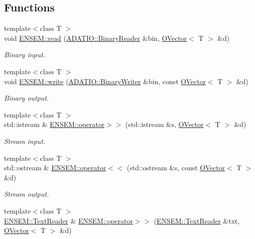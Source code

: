 \subsection*{Functions}
\begin{DoxyCompactItemize}
\item 
{\footnotesize template$<$class T $>$ }\\void \mbox{\hyperlink{group__obsvector_ga78b51667ce539bc967764a39c77afbe0}{E\+N\+S\+E\+M\+::read}} (\mbox{\hyperlink{classADATIO_1_1BinaryReader}{A\+D\+A\+T\+I\+O\+::\+Binary\+Reader}} \&bin, \mbox{\hyperlink{classENSEM_1_1OVector}{O\+Vector}}$<$ T $>$ \&d)
\begin{DoxyCompactList}\small\item\em Binary input. \end{DoxyCompactList}\item 
{\footnotesize template$<$class T $>$ }\\void \mbox{\hyperlink{group__obsvector_gab76c1efedcd0fb2cbe27c2c995c6d110}{E\+N\+S\+E\+M\+::write}} (\mbox{\hyperlink{classADATIO_1_1BinaryWriter}{A\+D\+A\+T\+I\+O\+::\+Binary\+Writer}} \&bin, const \mbox{\hyperlink{classENSEM_1_1OVector}{O\+Vector}}$<$ T $>$ \&d)
\begin{DoxyCompactList}\small\item\em Binary output. \end{DoxyCompactList}\item 
{\footnotesize template$<$class T $>$ }\\std\+::istream \& \mbox{\hyperlink{group__obsvector_ga1777cce8b68792ed5e825b20f286394e}{E\+N\+S\+E\+M\+::operator$>$$>$}} (std\+::istream \&s, \mbox{\hyperlink{classENSEM_1_1OVector}{O\+Vector}}$<$ T $>$ \&d)
\begin{DoxyCompactList}\small\item\em Stream input. \end{DoxyCompactList}\item 
{\footnotesize template$<$class T $>$ }\\std\+::ostream \& \mbox{\hyperlink{group__obsvector_ga9f3b52a0bbdae09acbfdfc9471404f5d}{E\+N\+S\+E\+M\+::operator$<$$<$}} (std\+::ostream \&s, const \mbox{\hyperlink{classENSEM_1_1OVector}{O\+Vector}}$<$ T $>$ \&d)
\begin{DoxyCompactList}\small\item\em Stream output. \end{DoxyCompactList}\item 
{\footnotesize template$<$class T $>$ }\\\mbox{\hyperlink{classENSEM_1_1TextReader}{E\+N\+S\+E\+M\+::\+Text\+Reader}} \& \mbox{\hyperlink{group__obsvector_gacb0aa516bb0d8f52c729250ac9faff3f}{E\+N\+S\+E\+M\+::operator$>$$>$}} (\mbox{\hyperlink{classENSEM_1_1TextReader}{E\+N\+S\+E\+M\+::\+Text\+Reader}} \&txt, \mbox{\hyperlink{classENSEM_1_1OVector}{O\+Vector}}$<$ T $>$ \&d)

\end{DoxyCompactItemize}
